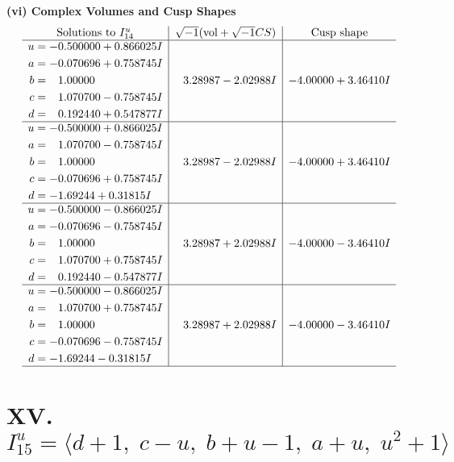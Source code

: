 \documentclass[1p]{elsarticle_modified}
\theoremstyle{definition}
\newcommand{\I}{\sqrt{-1}}
\begin{document}
\newpage\flushleft \textbf{(vi) Complex Volumes and Cusp Shapes}
$$\begin{array}{c|c|c}  
\text{Solutions to }I^u_{14}& \I (\text{vol} + \sqrt{-1}CS) & \text{Cusp shape}\\
 \hline 
\begin{aligned}
u &= -0.500000 + 0.866025 I \\
a &= -0.070696 + 0.758745 I \\
b &= \phantom{-}1.00000\phantom{ +0.000000I} \\
c &= \phantom{-}1.070700 - 0.758745 I \\
d &= \phantom{-}0.192440 + 0.547877 I\end{aligned}
 & \phantom{-}3.28987 - 2.02988 I & -4.00000 + 3.46410 I \\ \hline\begin{aligned}
u &= -0.500000 + 0.866025 I \\
a &= \phantom{-}1.070700 - 0.758745 I \\
b &= \phantom{-}1.00000\phantom{ +0.000000I} \\
c &= -0.070696 + 0.758745 I \\
d &= -1.69244 + 0.31815 I\end{aligned}
 & \phantom{-}3.28987 - 2.02988 I & -4.00000 + 3.46410 I \\ \hline\begin{aligned}
u &= -0.500000 - 0.866025 I \\
a &= -0.070696 - 0.758745 I \\
b &= \phantom{-}1.00000\phantom{ +0.000000I} \\
c &= \phantom{-}1.070700 + 0.758745 I \\
d &= \phantom{-}0.192440 - 0.547877 I\end{aligned}
 & \phantom{-}3.28987 + 2.02988 I & -4.00000 - 3.46410 I \\ \hline\begin{aligned}
u &= -0.500000 - 0.866025 I \\
a &= \phantom{-}1.070700 + 0.758745 I \\
b &= \phantom{-}1.00000\phantom{ +0.000000I} \\
c &= -0.070696 - 0.758745 I \\
d &= -1.69244 - 0.31815 I\end{aligned}
 & \phantom{-}3.28987 + 2.02988 I & -4.00000 - 3.46410 I\\
 \hline 
 \end{array}$$\newpage\newpage\renewcommand{\arraystretch}{1}
\centering \section*{XV. $I^u_{15}= \langle d+1,\;c- u,\;b+u-1,\;a+u,\;u^2+1 \rangle$}
\end{document}
